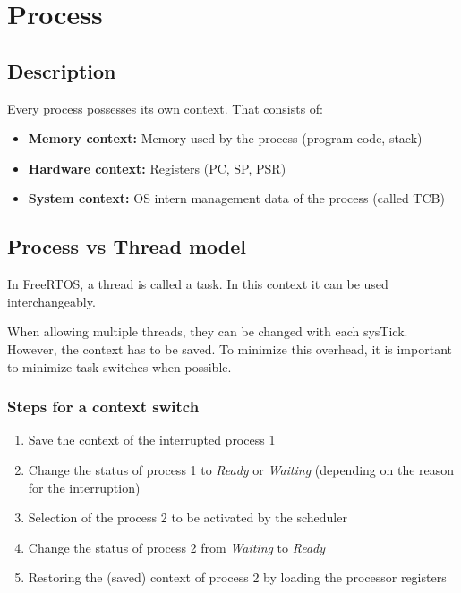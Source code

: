 \section{Process}

\subsection{Description}

Every process possesses its own context.
That consists of:
\begin{itemize}
    \item \textbf{Memory context:} Memory used by the process (program code, stack)
    \item \textbf{Hardware context:} Registers (PC, SP, PSR)
    \item \textbf{System context:} OS intern management data of the process (called TCB)
\end{itemize}


\subsection{Process vs Thread model}

In FreeRTOS, a thread is called a task.
In this context it can be used interchangeably.

When allowing multiple threads, they can be changed with each sysTick.
However, the context has to be saved.
To minimize this overhead, it is important to minimize task switches when possible.

\subsubsection{Steps for a context switch}

\begin{enumerate}
    \item Save the context of the interrupted process 1
    \item Change the status of process 1 to \emph{Ready} or \emph{Waiting} (depending on the reason for the interruption)
    \item Selection of the process 2 to be activated by the scheduler
    \item Change the status of process 2 from \emph{Waiting} to \emph{Ready}
    \item Restoring the (saved) context of process 2 by loading the processor registers
\end{enumerate}

